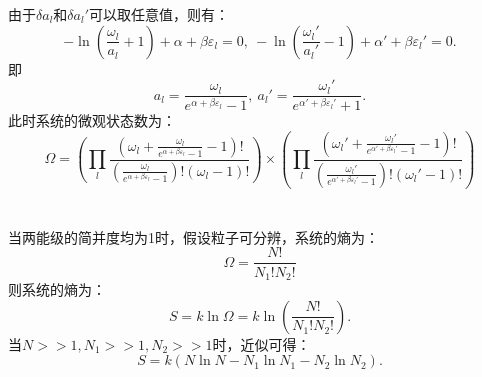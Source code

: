 \documentclass[a4paper,12pt]{article}
\begin{document}
由于$\delta a_l$和$\delta a_l'$可以取任意值，则有：
\begin{equation}\nonumber
	-\ln\left( \frac{\omega_l}{a_l} + 1 \right) + \alpha + \beta\varepsilon_l = 0, ~ -\ln\left( \frac{\omega_l'}{a_l'} - 1 \right) + \alpha' + \beta\varepsilon_l' = 0.
\end{equation}
即
\begin{equation}\nonumber
	a_l = \frac{\omega_l}{e^{\alpha + \beta\varepsilon_l} - 1}, ~ a_l' = \frac{\omega_l'}{e^{\alpha' + \beta\varepsilon_l'} + 1}.
\end{equation}
此时系统的微观状态数为：
\begin{equation}\nonumber
	\Omega = \left( \prod_l \frac{(\omega_l+\frac{\omega_l}{e^{\alpha+\beta\varepsilon_l}-1}-1)!}{(\frac{\omega_l}{e^{\alpha+\beta\varepsilon_l}-1})!(\omega_l-1)!} \right) \times \left( \prod_l \frac{(\omega_l'+\frac{\omega_l'}{e^{\alpha'+\beta\varepsilon_l'}-1}-1)!}{(\frac{\omega_l'}{e^{\alpha'+\beta\varepsilon_l'}-1})!(\omega_l'-1)!} \right)
\end{equation}



\section{}
当两能级的简并度均为1时，假设粒子可分辨，系统的熵为：
\begin{equation}\nonumber
	\Omega = \frac{N!}{N_1!N_2!}
\end{equation}
则系统的熵为：
\begin{equation}\nonumber
	S = k \ln\Omega = k \ln\left( \frac{N!}{N_1!N_2!} \right).
\end{equation}
当$N>>1,N_1>>1,N_2>>1$时，近似可得：
\begin{equation}\nonumber
	S = k\left(N\ln N - N_1\ln N_1 -N_2\ln N_2 \right).
\end{equation}
\end{document}
